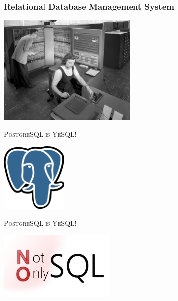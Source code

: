 \documentclass{beamer}
\begin{document}
\begin{frame}
  \frametitle{Relational Database Management System}

  \begin{center}
    \includegraphics[height=2.1in]{IBM_Electronic_Data_Processing_Machine_-_GPN-2000-001881.jpg}
  \end{center}
\end{frame}

\begin{frame}
  \begin{center}
    \textsc{\Huge PostgreSQL is YeSQL!}
    \vfill

    \includegraphics[height=9em]{postgres-logo.eps}
  \end{center}
\end{frame}

\begin{frame}
  \begin{center}
    \textsc{\Huge PostgreSQL is YeSQL!}
    \vfill

    \includegraphics[height=9em]{nosql-bigdata.png}
  \end{center}
\end{frame}
\end{document}
